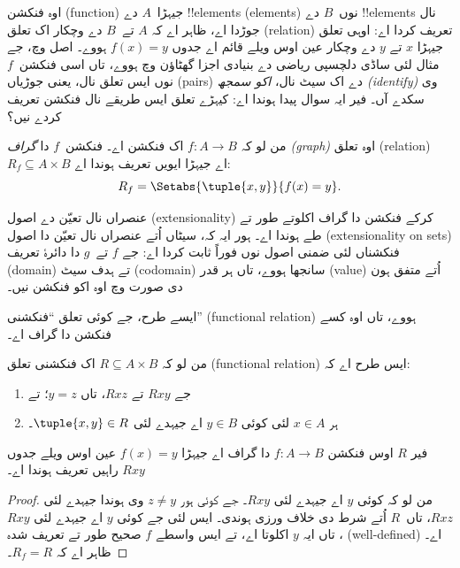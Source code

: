 \documentclass[../../../include/open-logic-section]{subfiles}
\begin{document}


\begin{explain}
اوہ فنکشن (function) جیہڑا~$A$ دے !!{element}s (elements) نوں~$B$ دے
!!{element}s نال جوڑدا اے، ظاہر اے کہ $A$ تے~$B$ دے وچکار اک تعلق
(relation) تعریف کردا اے:
اوہی تعلق جیہڑا $x$ تے $y$ دے وچکار عین اوس ویلے قائم اے جدوں
$f(x) = y$ ہووے۔ اصل وچ، جے مثال لئی ساڈی دلچسپی ریاضی دے بنیادی
اجزا گھٹاؤن وچ ہووے، تاں اسی فنکشن~$f$ نوں ایس تعلق نال، یعنی جوڑیاں
(pairs) دے اک سیٹ نال، \emph{اکو سمجھ (identify)} وی سکدے آں۔ فیر ایہ سوال پیدا ہوندا
اے: کیہڑے تعلق ایس طریقے نال فنکشن تعریف کردے نیں؟
\end{explain}

\begin{defn} من لو کہ $f\colon A \to B$ اک فنکشن اے۔
فنکشن~$f$ دا \emph{گراف (graph)} اوہ تعلق (relation) $R_f \subseteq A \times B$ اے
جیہڑا ایویں تعریف ہوندا اے:
\[
R_f = \Setabs{\tuple{x,y}}{f(x) = y}.
\]
\end{defn}

\begin{explain}
عنصراں نال تعیّن دے اصول (extensionality) کرکے فنکشن دا گراف اکلوتے طور تے طے ہوندا
اے۔ ہور ایہ کہ، سیٹاں اُتے عنصراں نال تعیّن دا اصول (extensionality on sets) فنکشناں لئی
ضمنی اصول نوں فوراً ثابت کردا اے: جے $f$ تے~$g$ دا دائرۂ تعریف (domain) تے
ہدف سیٹ (codomain) سانجھا ہووے، تاں ہر قدر (value) اُتے متفق ہون دی صورت وچ اوہ اکو
فنکشن نیں۔

ایسے طرح، جے کوئی تعلق ``فنکشنی'' (functional relation) ہووے، تاں اوہ
کسے فنکشن دا گراف اے۔
\end{explain}

\begin{prop}
من لو کہ $R \subseteq A \times B$ اک فنکشنی تعلق (functional relation) ایس طرح اے کہ:
\begin{enumerate}
\item جے $Rxy$ تے $Rxz$، تاں $y = z$؛ تے
\item ہر $x \in A$ لئی کوئی $y \in B$ اے جیہدے لئی $\tuple{x,
y} \in R$۔
\end{enumerate}
فیر $R$ اوس فنکشن $f\colon A \to B$ دا گراف اے جیہڑا
$f(x) = y$ عین اوس ویلے جدوں $Rxy$ راہیں تعریف ہوندا اے۔
\end{prop}

\begin{proof}
من لو کہ کوئی $y$ اے جیہدے لئی $Rxy$۔ جے کوئی ہور $z \neq y$ وی
ہوندا جیہدے لئی $Rxz$، تاں~$R$ اُتے شرط دی خلاف ورزی ہوندی۔ ایس
لئی جے کوئی $y$ اے جیہدے لئی $Rxy$، تاں ایہ $y$ اکلوتا اے، تے ایس
واسطے $f$ صحیح طور تے تعریف شدہ (well-defined) اے۔ ظاہر اے کہ $R_f = R$۔
\end{proof}
\end{document}
